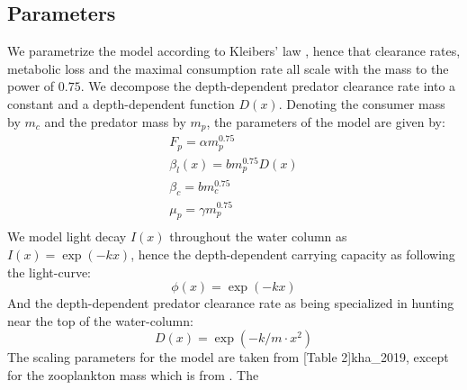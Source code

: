 \subsection{Parameters}
We parametrize the model according to Kleibers' law \citep{yodzis1992body}, hence that clearance rates, metabolic loss and the maximal consumption rate all scale with the mass to the power of $0.75$. We decompose the depth-dependent predator clearance rate into a constant and a depth-dependent function $D(x)$. Denoting the consumer mass by $m_c$ and the predator mass by $m_p$, the parameters of the model are given by:
\begin{equation}
  \begin{split}
    F_p = \alpha m_p^{0.75} \\
    \beta_l(x) = b m_p^{0.75} D(x) \\
    \beta_c = b m_c^{0.75} \\
    \mu_p = \gamma m_p^{0.75} \\
  \end{split}
\end{equation}
We model light decay $I(x)$ throughout the water column as $I(x)=\exp(-kx)$, hence the depth-dependent carrying capacity as following the light-curve:
\begin{equation}
  \phi(x) = \exp(-kx)
\end{equation}
And the depth-dependent predator clearance rate as being specialized in hunting near the top of the water-column:
\begin{equation}
  D(x) = \exp(-k/m \cdot x^2)
\end{equation}
The scaling parameters for the model are taken from [Table 2]{kha_2019}, except for the zooplankton mass which is from \citep{kiorboe2011zooplankton}. The
